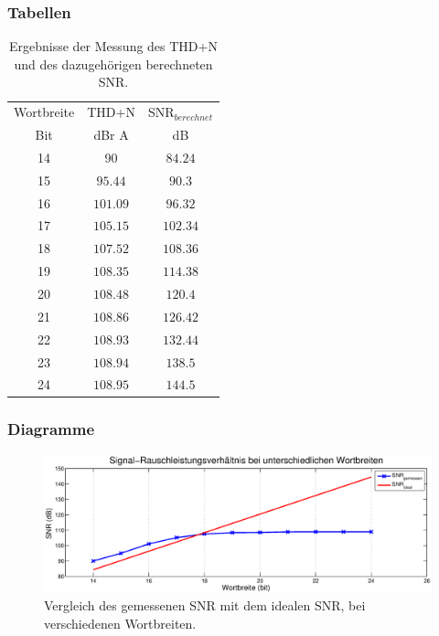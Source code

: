 \subsubsection{Tabellen}
\begin{table}[h!]
  \begin{center}
    \begin{tabular}{ c  c c }
    \toprule
    Wortbreite &THD+N & SNR$_{berechnet}$\\
    Bit &dBr A & dB  \\ \midrule
    14 & 	90 & $84.24$  \\
    15 & 	$95.44$ & $90.3$  \\
    16 & 	$101.09$ & $96.32$  \\
    17 & 	$105.15$ & $102.34$  \\
    18 & 	$107.52$ & $108.36$  \\
    19 & 	$108.35$ & $114.38$  \\
    20 & 	$108.48$ & $120.4$  \\
    21 & 	$108.86$ & $126.42$  \\
    22 & 	$108.93$ & $132.44$  \\
    23 & 	$108.94$ & $138.5$  \\
    24 & 	$108.95$ & $144.5$  \\ \bottomrule
    \end{tabular}
  \end{center}
  \caption{Ergebnisse der Messung des THD+N und des dazugehörigen berechneten SNR.}
  \label{tab:snrthd}
\end{table}
\clearpage
\subsubsection{Diagramme}

\begin{figure}[h!]
\centering

\includegraphics[width=\columnwidth]{figures/snr_wortbreite.eps} 
\caption{Vergleich des gemessenen SNR mit dem idealen SNR, bei verschiedenen Wortbreiten.}
\label{fig:d1}
\end{figure}

